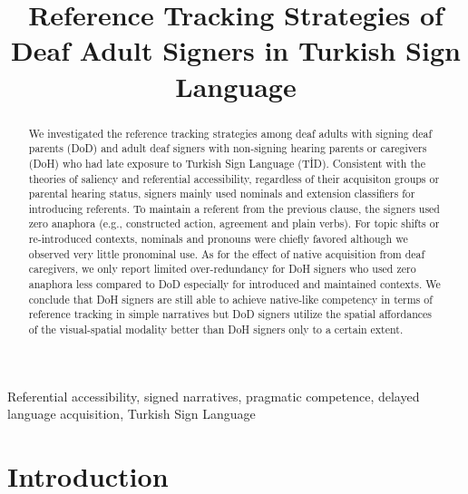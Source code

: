 \documentclass[]{elsarticle} %
\begin{document}
\begin{frontmatter}

  \title{Reference Tracking Strategies of Deaf Adult Signers in Turkish
Sign Language}
      
  \begin{abstract}
  We investigated the reference tracking strategies among deaf adults
  with signing deaf parents (DoD) and adult deaf signers with
  non-signing hearing parents or caregivers (DoH) who had late exposure
  to Turkish Sign Language (TİD). Consistent with the theories of
  saliency and referential accessibility, regardless of their acquisiton
  groups or parental hearing status, signers mainly used nominals and
  extension classifiers for introducing referents. To maintain a
  referent from the previous clause, the signers used zero anaphora
  (e.g., constructed action, agreement and plain verbs). For topic
  shifts or re-introduced contexts, nominals and pronouns were chiefly
  favored although we observed very little pronominal use. As for the
  effect of native acquisition from deaf caregivers, we only report
  limited over-redundancy for DoH signers who used zero anaphora less
  compared to DoD especially for introduced and maintained contexts. We
  conclude that DoH signers are still able to achieve native-like
  competency in terms of reference tracking in simple narratives but DoD
  signers utilize the spatial affordances of the visual-spatial modality
  better than DoH signers only to a certain extent.
  \end{abstract}
   \begin{keyword} Referential accessibility, signed narratives,
pragmatic competence, delayed language acquisition, Turkish Sign
Language\end{keyword}
 \end{frontmatter}

\hypertarget{introduction}{%
\section{Introduction}\label{introduction}}
\end{document}
